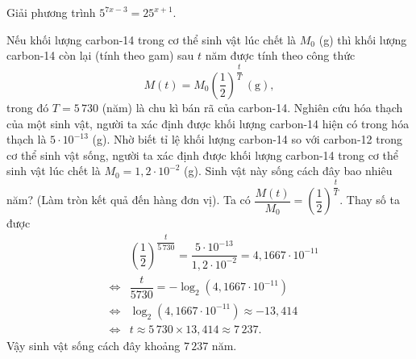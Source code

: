 \begin{ex}%
	Giải phương trình $5^{7x-3} = 25^{x+1}$.
\end{ex}

\begin{ex}%
	Nếu khối lượng carbon-14 trong cơ thể sinh vật lúc chết là $M_0$ (g) thì khối lượng carbon-14 còn lại (tính theo gam) sau $t$ năm được tính theo công thức
	\[
	M(t)=M_0\left(\dfrac{1}{2}\right)^{\dfrac{t}{T}} \, (\text{g}),
	\]
	trong đó $T=5\,730$ (năm) là chu kì bán rã của carbon-14. Nghiên cứu hóa thạch của một sinh vật, người ta xác định được khối lượng carbon-14 hiện có trong hóa thạch là $5\cdot10^{-13}$ (g). Nhờ biết tỉ lệ khối lượng carbon-14 so với carbon-12 trong cơ thể sinh vật sống, người ta xác định được khối lượng carbon-14 trong cơ thể sinh vật lúc chết là $M_0=1{,}2\cdot10^{-2}$ (g). Sinh vật này sống cách đây bao nhiêu năm? (Làm tròn kết quả đến hàng đơn vị).
	\loigiai
	{
		Ta có $\dfrac{M(t)}{M_0}=\left(\dfrac{1}{2}\right)^{\dfrac{t}{T}}$.
		Thay số ta được 
		\begin{eqnarray*}
			&&\left(\dfrac{1}{2}\right)^{\dfrac{t}{5\,730}}=\dfrac{5\cdot10^{-13}}{1{,}2\cdot10^{-2}}=4{,}1667\cdot10^{-11}\\
			&\Leftrightarrow&\dfrac{t}{5730}=-\log_2\left(4{,}1667\cdot10^{-11}\right)\\
			&\Leftrightarrow&\log_2\left(4{,}1667\cdot10^{-11}\right)\approx -13{,}414\\
			&\Leftrightarrow&t\approx5\,730\times13{,}414\approx7\,237.
		\end{eqnarray*}
	Vậy sinh vật sống cách đây khoảng $7\,237$ năm.
	}
\end{ex}

